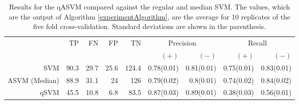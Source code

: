 \documentclass[twoside,11pt]{article}
\begin{document}
\begin{table}[htbp]\label{table:HeartDisease3}
  \centering
    \tiny\begin{tabular}{rrrrrrrrr}
    \hline
       & \multirow{2}{*}{TP}    & \multirow{2}{*}{FN}    & \multirow{2}{*}{FP}    & \multirow{2}{*}{TN} & \multicolumn{2}{c}{Precision} & \multicolumn{2}{c}{Recall}\\
&&&&&  $(+)$ &  $(-)$ &  $(+)$ &  $(-)$ \bigstrut\\
\hline
\hline
SVM   & 90.3  & 29.7  & 25.6  & 124.4 & 0.78(0.01) & 0.81(0.01) & 0.75(0.01) & 0.83(0.01) \bigstrut[t]\\
ASVM (Median) & 88.9  & 31.1  & 24    & 126   & 0.79(0.02) & 0.8(0.01) & 0.74(0.02) & 0.84(0.02) \\
qSVM  & 45.5  & 10.8  & 6.8   & 83.5  & 0.87(0.03) & 0.89(0.01) & 0.38(0.03) & 0.56(0.01) \bigstrut[b]\\
\hline
\hline
    \end{tabular}%
    \caption{Results for the qASVM compared against the regular and median SVM. The values, which are the output of Algorithm \ref{experimentAlgorithm}, are the average for 10 replicates of the five fold cross-validation. Standard deviations are shown in the parenthesis.}
\end{table}%
\end{document}
